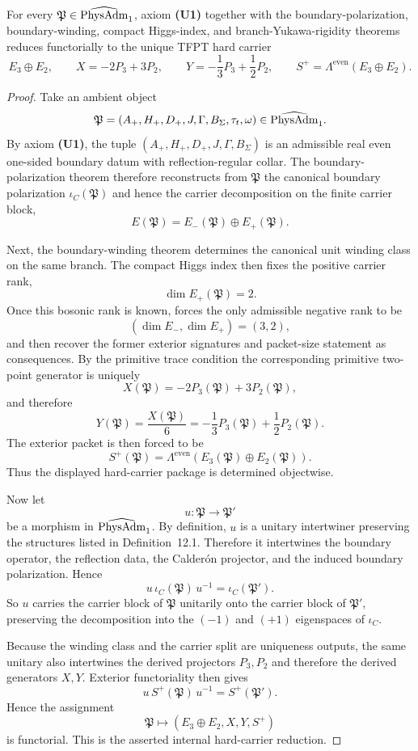 \begin{theorem}
\label{prop:universal-carrier-reduction}
For every $\mathfrak P\in\widehat{\mathrm{PhysAdm}}_1$, axiom \textbf{(U1)} together with the boundary-polarization,
boundary-winding, compact Higgs-index, and branch-Yukawa-rigidity theorems reduces functorially to
the unique TFPT hard carrier
\[
E_3\oplus E_2,
\qquad
X=-2P_3+3P_2,
\qquad
Y=-\frac13P_3+\frac12P_2,
\qquad
S^+=\Lambda^{\mathrm{even}}(E_3\oplus E_2).
\]
\end{theorem}

\begin{proof}
Take an ambient object
\[
\mathfrak P=(A_+,H_+,D_+,J,\Gamma,B_\Sigma,\tau_t,\omega)\in\widehat{\mathrm{PhysAdm}}_1.
\]
By axiom \textbf{(U1)}, the tuple $(A_+,H_+,D_+,J,\Gamma,B_\Sigma)$ is an admissible real even
one-sided boundary datum with reflection-regular collar. The boundary-polarization theorem
therefore reconstructs from $\mathfrak P$ the canonical boundary polarization $\iota_C(\mathfrak
P)$ and hence the carrier decomposition on the finite carrier block,
\[
E(\mathfrak P)=E_-(\mathfrak P)\oplus E_+(\mathfrak P).
\]

Next, the boundary-winding theorem determines the canonical unit winding class on the same branch.
The compact Higgs index then fixes the positive carrier rank,
\[
\dim E_+(\mathfrak P)=2.
\]
Once this bosonic rank is known,  forces the only admissible negative
rank to be
\[
(\dim E_-,\dim E_+)=(3,2),
\]
and  then recover the former exterior
signatures and packet-size statement as consequences. By the primitive trace condition the
corresponding primitive two-point generator is uniquely
\[
X(\mathfrak P)=-2P_3(\mathfrak P)+3P_2(\mathfrak P),
\]
and therefore
\[
Y(\mathfrak P)=\frac{X(\mathfrak P)}6=-\frac13P_3(\mathfrak P)+\frac12P_2(\mathfrak P).
\]
The exterior packet is then forced to be
\[
S^+(\mathfrak P)=\Lambda^{\mathrm{even}}(E_3(\mathfrak P)\oplus E_2(\mathfrak P)).
\]
Thus the displayed hard-carrier package is determined objectwise.

Now let
\[
u:\mathfrak P\to \mathfrak P'
\]
be a morphism in $\widehat{\mathrm{PhysAdm}}_1$. By definition, $u$ is a unitary intertwiner preserving the
structures listed in Definition~12.1. Therefore it intertwines the boundary operator, the
reflection data, the Calder\'on projector, and the induced boundary polarization. Hence
\[
u\,\iota_C(\mathfrak P)\,u^{-1}=\iota_C(\mathfrak P').
\]
So $u$ carries the carrier block of $\mathfrak P$ unitarily onto the carrier block of $\mathfrak
P'$, preserving the decomposition into the $(-1)$ and $(+1)$ eigenspaces of $\iota_C$.

Because the winding class and the carrier split are uniqueness outputs, the same unitary also
intertwines the derived projectors $P_3,P_2$ and therefore the derived generators $X,Y$. Exterior
functoriality then gives
\[
u\,S^+(\mathfrak P)\,u^{-1}=S^+(\mathfrak P').
\]
Hence the assignment
\[
\mathfrak P\longmapsto (E_3\oplus E_2,X,Y,S^+)
\]
is functorial. This is the asserted internal hard-carrier reduction.
\end{proof}

